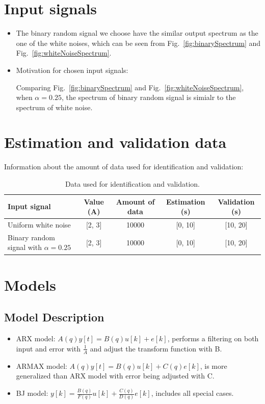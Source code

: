 \documentclass[10pt,a4paper]{article}
\begin{document}
\section{Input signals}
\begin{itemize}
    \item The binary random signal we choose have the similar output spectrum as the one of the white noises, which can be seen from Fig.~\ref{fig:binarySpectrum} and Fig.~\ref{fig:whiteNoiseSpectrum}.
    \item Motivation for chosen input signals:
    \par Comparing Fig.~\ref{fig:binarySpectrum} and Fig.~\ref{fig:whiteNoiseSpectrum}, when $\alpha=0.25$, the spectrum of binary random signal is simialr to the spectrum of white noise.
\end{itemize}

\section{Estimation and validation data}
\par Information about the amount of data used for identification and validation:
    \begin{table}[h]
	    \footnotesize
    	\centering
    	\caption{Data used for identification and validation.}
    	\label{table:data}
    	\begin{tabular}{lcccc}
    	\hline
    	Input signal & Value (A) & Amount of data & Estimation (s) & Validation (s) \\
    	\hline
    	Uniform white noise & [2, 3] & 10000 & [0, 10] & [10, 20] \\
    	Binary random signal with $\alpha = 0.25$ & [2, 3] & 10000 & [0, 10] & [10, 20] \\
    	\hline
    	\end{tabular}
    \end{table}

\section{Models}
\subsection{Model Description}
\begin{itemize}
	\item ARX model: $A(q) y[t] = B(q) u[k] + e[k]$, performs a filtering on both input and error with $\frac{1}{A}$ and adjust the transform function with B.
    \item ARMAX model: $A(q) y[t] = B(q) u[k] + C(q) e[k]$, is more generalized than ARX model with error being adjusted with C.
    \item BJ model: $y[k] = \frac{B(q)}{F(q)} u[k] + \frac{C(q)}{D(q)} e[k]$, includes all special cases.
\end{itemize}
\end{document}
